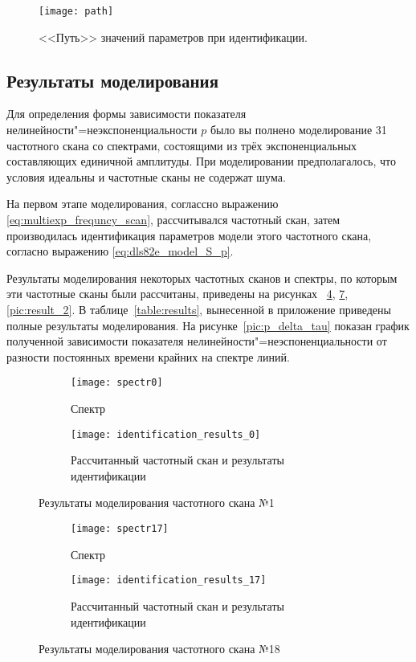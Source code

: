 	\begin{figure}[h!]
		\centering
		\texttt{[image: path]}
		\caption{<<Путь>> значений параметров при идентификации.}
		\label{pic:param_path}
	\end{figure}


	\subsection{Результаты моделирования}

	Для определения формы зависимости показателя 
	нелинейности"=неэкспоненциальности $p$ было вы полнено моделирование 
	31 частотного скана со спектрами, состоящими из трёх экспоненциальных
	составляющих единичной амплитуды. При моделировании предполагалось,
	что условия идеальны и частотные сканы не содержат шума.

	На первом этапе моделирования, соглассно выражению \ref{eq:multiexp_frequncy_scan},
	рассчитывался частотный скан, затем производилась идентификация 
	параметров модели этого частотного скана, согласно выражению 
	\ref{eq:dls82e_model_S_p}.

	Результаты моделирования некоторых частотных сканов и спектры, по 
	которым эти частотные сканы были рассчитаны, приведены на рисунках~
	\ref{pic:result_0},	\ref{pic:result_1}, \ref{pic:result_2}. 
	В таблице~\ref{table:results}, вынесенной в приложение приведены 
	полные результаты моделирования. На рисунке~\ref{pic:p_delta_tau} 
	показан график полученной зависимости показателя	
	нелинейности"=неэспоненциальности от разности постоянных времени
	крайних на спектре линий.

	\begin{figure}[h!]
		\centering
		\begin{subfigure}[c]{0.3\textwidth}
			\texttt{[image: spectr0]}
			\caption{Спектр}
			\label{pic:results_0_spectr}
		\end{subfigure}
		\begin{subfigure}[c]{0.45\textwidth}
			\texttt{[image: identification\_results\_0]}
			\caption{Рассчитанный частотный скан и результаты идентификации}
			\label{pic:results_0_scan}
		\end{subfigure}
		\caption{Результаты моделирования частотного скана №1}
		\label{pic:result_0}
	\end{figure}

	\begin{figure}[h!]
		\centering
		\begin{subfigure}[c]{0.3\textwidth}
			\texttt{[image: spectr17]}
			\caption{Спектр}
			\label{pic:results_1_spectr}
		\end{subfigure}
		\begin{subfigure}[c]{0.45\textwidth}
			\texttt{[image: identification\_results\_17]}
			\caption{Рассчитанный частотный скан и результаты идентификации}
			\label{pic:results_1_scan}
		\end{subfigure}
		\caption{Результаты моделирования частотного скана №18}
		\label{pic:result_1}
	\end{figure}

